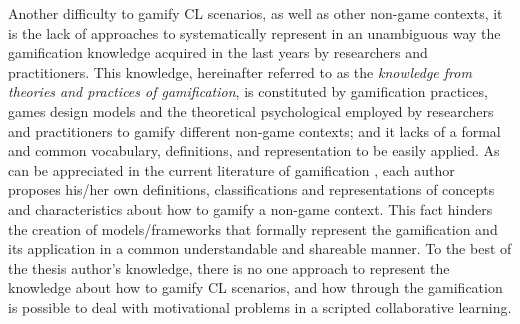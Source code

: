 Another difficulty to gamify CL scenarios, as well as other non-game contexts, it is the lack of approaches to systematically represent in an unambiguous way the gamification knowledge acquired in the last years by researchers and practitioners.
This knowledge, hereinafter referred to as the \emph{knowledge from theories and practices of gamification}, is constituted by gamification practices, games design models and the theoretical psychological employed by researchers and practitioners to gamify different non-game contexts; and it lacks of a formal and common vocabulary, definitions, and representation to be easily applied.
As can be appreciated in the current literature of gamification \cite{DichevaDichevAgreAngelova2015, HamariKoivistoSarsa2014, MoraRieraGonzalezArnedo-Moreno2015, SeabornFels2015}, each author proposes his/her own definitions, classifications and representations of concepts and characteristics about how to gamify a non-game context.
This fact hinders the creation of models/frameworks that formally represent the gamification and its application in a common understandable and shareable manner.
To the best of the thesis author's knowledge, there is no one approach to represent the knowledge about how to gamify CL scenarios, and how through the gamification is possible to deal with motivational problems in a scripted collaborative learning.

